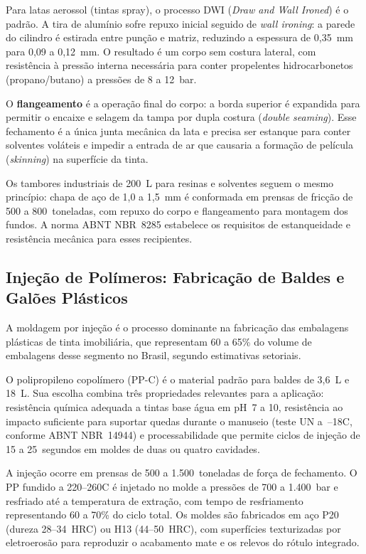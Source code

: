 \documentclass[
  12pt,
  a4paper,
  oneside,
  brazil,
  chapter=TITLE
]{article}
\begin{document}
Para latas aerossol (tintas spray), o processo DWI (\textit{Draw and Wall
Ironed}) é o padrão. A tira de alumínio sofre repuxo inicial seguido de
\textit{wall ironing}: a parede do cilindro é estirada entre punção e matriz,
reduzindo a espessura de 0,35~mm para 0,09 a 0,12~mm. O resultado é um corpo sem
costura lateral, com resistência à pressão interna necessária para conter
propelentes hidrocarbonetos (propano/butano) a pressões de 8 a 12~bar.

O \textbf{flangeamento} é a operação final do corpo: a borda superior é expandida
para permitir o encaixe e selagem da tampa por dupla costura (\textit{double
seaming}). Esse fechamento é a única junta mecânica da lata e precisa ser
estanque para conter solventes voláteis e impedir a entrada de ar que causaria a
formação de película (\textit{skinning}) na superfície da tinta.

Os tambores industriais de 200~L para resinas e solventes seguem o mesmo
princípio: chapa de aço de 1,0 a 1,5~mm é conformada em prensas de fricção de
500 a 800~toneladas, com repuxo do corpo e flangeamento para montagem dos fundos.
A norma ABNT NBR~8285 estabelece os requisitos de estanqueidade e resistência
mecânica para esses recipientes.

\subsection{Injeção de Polímeros: Fabricação de Baldes e Galões Plásticos}\label{injecao}

A moldagem por injeção é o processo dominante na fabricação das embalagens
plásticas de tinta imobiliária, que representam 60 a 65\% do volume de embalagens
desse segmento no Brasil, segundo estimativas setoriais.

O polipropileno copolímero (PP-C) é o material padrão para baldes de 3,6~L e
18~L. Sua escolha combina três propriedades relevantes para a aplicação:
resistência química adequada a tintas base água em pH~7 a 10, resistência ao
impacto suficiente para suportar quedas durante o manuseio (teste UN a~--18\textdegree{}C,
conforme ABNT NBR~14944) e processabilidade que permite ciclos de injeção de 15 a
25~segundos em moldes de duas ou quatro cavidades.

A injeção ocorre em prensas de 500 a 1.500~toneladas de força de fechamento. O PP
fundido a 220--260\textdegree{}C é injetado no molde a pressões de 700 a 1.400~bar e
resfriado até a temperatura de extração, com tempo de resfriamento representando
60 a 70\% do ciclo total. Os moldes são fabricados em aço P20 (dureza 28--34~HRC)
ou H13 (44--50~HRC), com superfícies texturizadas por eletroerosão para reproduzir
o acabamento mate e os relevos do rótulo integrado.
\end{document}
